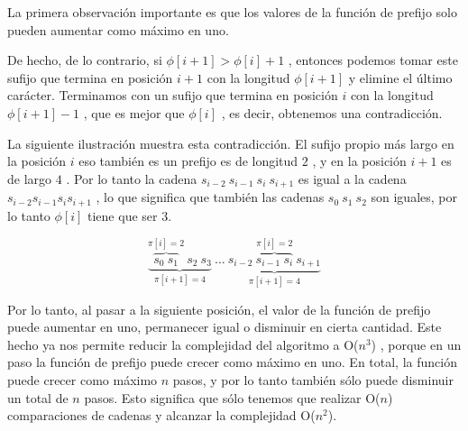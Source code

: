 La primera observación importante es que los valores de la función de prefijo solo pueden aumentar como máximo en uno.

De hecho, de lo contrario, si $\phi[i + 1] > \phi[i] + 1$ , entonces podemos tomar este sufijo que termina en posición $i + 1$ con la longitud $\phi[i + 1]$ y elimine el último carácter. Terminamos con un sufijo que termina en posición $i$ con la longitud $\phi[i + 1] - 1$ , que es mejor que $\phi[i]$ , es decir, obtenemos una contradicción.

La siguiente ilustración muestra esta contradicción. El sufijo propio más largo en la posición $i$ eso también es un prefijo es de longitud $2$ , y en la 
posición $i + 1$ es de largo $4$ . Por lo tanto la cadena $s_{i-2}~s_{i-1}~s_{i}~s_{i+1}$ es igual a la cadena $s_{i-2}s_{i-1}s_is_{i+1}$
, lo que significa que también las cadenas $s_0 ~ s_1 ~ s_2$ son iguales, por lo tanto $\phi[i]$ 
tiene que ser $3$.

$$\underbrace{\overbrace{s_0 ~ s_1}^{\pi[i] = 2} ~ s_2 ~ s_3}_{\pi[i+1] = 4} ~ \dots ~ \underbrace{s_{i-2} ~ \overbrace{s_{i-1} ~ s_{i}}^{\pi[i] = 2} ~ s_{i+1}}_{\pi[i+1] = 4}$$

Por lo tanto, al pasar a la siguiente posición, el valor de la función de prefijo puede aumentar en uno, permanecer igual o disminuir en cierta cantidad.
Este hecho ya nos permite reducir la complejidad del algoritmo a O($n^3$) , porque en un paso la función de prefijo puede crecer como máximo en uno.
En total, la función puede crecer como máximo $n$ pasos, y por lo tanto también sólo puede disminuir un total de $n$ pasos. Esto significa que sólo
tenemos que realizar O($n$) comparaciones de cadenas y alcanzar la complejidad O($n^2$).